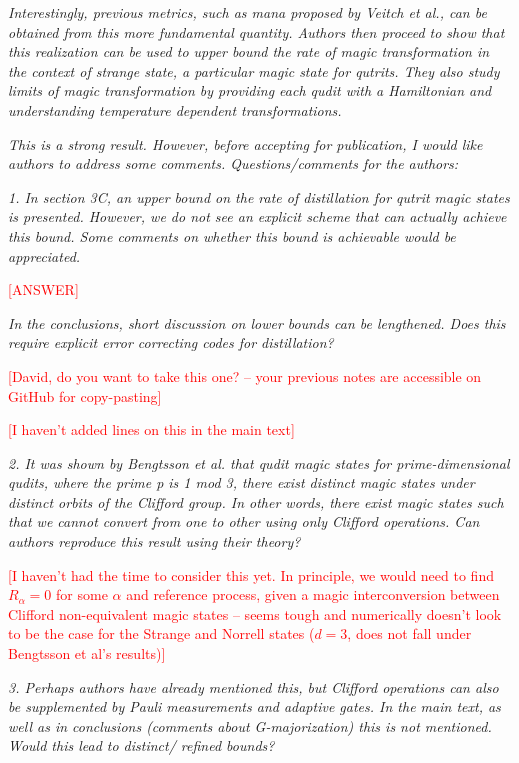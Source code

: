 \documentclass[11pt]{letter}
\newcommand{\nick}[1]{\textcolor{red}{[#1]}}
\begin{document}
\textit{Interestingly, previous metrics, such as mana proposed by Veitch et al., can be obtained from this more fundamental quantity. Authors then proceed to show that this realization can be used to upper bound the rate of magic transformation in the context of strange state, a particular magic state for qutrits. They also study limits of magic transformation by providing each qudit with a Hamiltonian and understanding temperature dependent transformations.}

\textit{This is a strong result. However, before accepting for publication, I would like authors to address some comments.
Questions/comments for the authors:}


\textit{1. In section 3C, an upper bound on the rate of distillation for qutrit magic states is presented. However, we do not see an explicit scheme that can actually achieve this bound. Some comments on whether this bound is achievable would be appreciated.}

\nick{ANSWER}

\textit{In the conclusions, short discussion on lower bounds can be lengthened. Does this require explicit error correcting codes for distillation?}

\nick{David, do you want to take this one? -- your previous notes are accessible on GitHub for copy-pasting}

\nick{I haven't added lines on this in the main text}

\textit{2. It was shown by Bengtsson et al. that qudit magic states for prime-dimensional qudits, where the prime p is 1 mod 3, there exist distinct magic states under distinct orbits of the Clifford group. In other words, there exist magic states such that we cannot convert from one to other using only Clifford operations. Can authors reproduce this result using their theory?}

\nick{I haven't had the time to consider this yet. In principle, we would need to find $R_\alpha = 0$ for some $\alpha$ and reference process, given a magic interconversion between Clifford non-equivalent magic states -- seems tough and numerically doesn't look to be the case for the Strange and Norrell states ($d=3$, does not fall under Bengtsson et al's results)}

\textit{3. Perhaps authors have already mentioned this, but Clifford operations can also be supplemented by Pauli measurements and adaptive gates. In the main text, as well as in conclusions (comments about G-majorization) this is not mentioned. Would this lead to distinct/ refined bounds?}
\end{document}
